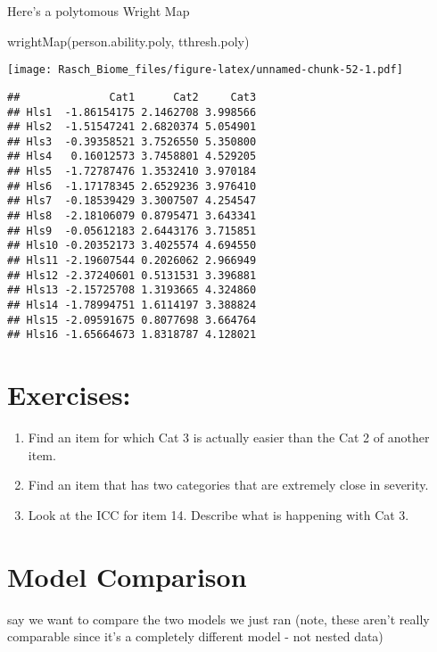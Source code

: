 \documentclass[
]{book}
\newenvironment{Shaded}{\begin{snugshade}}{\end{snugshade}}
\newcommand{\FunctionTok}[1]{\textcolor[rgb]{0.00,0.00,0.00}{#1}}
\newcommand{\NormalTok}[1]{#1}
\providecommand{\tightlist}{%
  \setlength{\itemsep}{0pt}\setlength{\parskip}{0pt}}
\begin{document}
Here's a polytomous Wright Map

\begin{Shaded}
\begin{Highlighting}[]
\FunctionTok{wrightMap}\NormalTok{(person.ability.poly, tthresh.poly)}
\end{Highlighting}
\end{Shaded}

\texttt{[image: Rasch\_Biome\_files/figure-latex/unnamed-chunk-52-1.pdf]}

\begin{verbatim}
##              Cat1      Cat2     Cat3
## Hls1  -1.86154175 2.1462708 3.998566
## Hls2  -1.51547241 2.6820374 5.054901
## Hls3  -0.39358521 3.7526550 5.350800
## Hls4   0.16012573 3.7458801 4.529205
## Hls5  -1.72787476 1.3532410 3.970184
## Hls6  -1.17178345 2.6529236 3.976410
## Hls7  -0.18539429 3.3007507 4.254547
## Hls8  -2.18106079 0.8795471 3.643341
## Hls9  -0.05612183 2.6443176 3.715851
## Hls10 -0.20352173 3.4025574 4.694550
## Hls11 -2.19607544 0.2026062 2.966949
## Hls12 -2.37240601 0.5131531 3.396881
## Hls13 -2.15725708 1.3193665 4.324860
## Hls14 -1.78994751 1.6114197 3.388824
## Hls15 -2.09591675 0.8077698 3.664764
## Hls16 -1.65664673 1.8318787 4.128021
\end{verbatim}

\hypertarget{exercises}{%
\section{Exercises:}\label{exercises}}

\begin{enumerate}
\def\labelenumi{\arabic{enumi}.}
\tightlist
\item
  Find an item for which Cat 3 is actually easier than the Cat 2 of another item.
\item
  Find an item that has two categories that are extremely close in severity.
\item
  Look at the ICC for item 14. Describe what is happening with Cat 3.
\end{enumerate}

\hypertarget{model-comparison}{%
\section{Model Comparison}\label{model-comparison}}

say we want to compare the two models we just ran (note, these aren't really comparable since it's a completely different model - not nested data)
\end{document}
